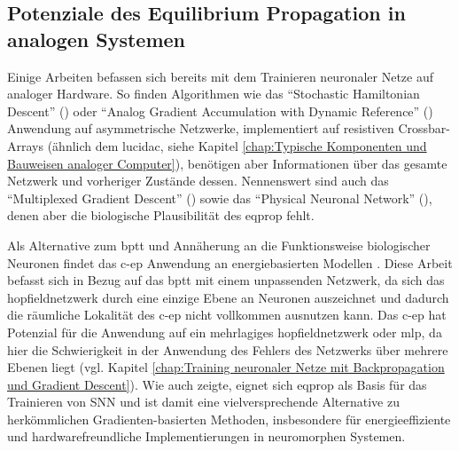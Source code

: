 \subsection{Potenziale des Equilibrium Propagation in analogen Systemen}
\label{chap:Potenziale des Equilibrium Propagation in analogen Systemen}

Einige Arbeiten befassen sich bereits mit dem Trainieren neuronaler Netze auf analoger Hardware. So finden Algorithmen wie das "`Stochastic Hamiltonian Descent"' (\cite{Onen2022}) oder "`Analog Gradient Accumulation with Dynamic Reference"' (\cite{Rasch2024}) Anwendung auf asymmetrische Netzwerke, implementiert auf resistiven Crossbar-Arrays (ähnlich \zb dem lucidac, siehe Kapitel \ref{chap:Typische Komponenten und Bauweisen analoger Computer}), benötigen aber Informationen über das gesamte Netzwerk und vorheriger Zustände dessen. Nennenswert sind auch das "`Multiplexed Gradient Descent"' (\cite{McCaughan2023}) sowie das "`Physical Neuronal Network"' (\cite{Sakemi2024}), denen aber die biologische Plausibilität des \gls{eqprop} fehlt.

Als Alternative zum \ac{bptt} und Annäherung an die Funktionsweise biologischer Neuronen findet das \gls{c-ep} Anwendung an energiebasierten Modellen \cite{Ernoult2020}. Diese Arbeit befasst sich in Bezug auf das \ac{bptt} mit einem unpassenden Netzwerk, da sich das \gls{hopfieldnetzwerk} durch eine einzige Ebene an Neuronen auszeichnet und dadurch die räumliche Lokalität des \gls{c-ep} nicht vollkommen ausnutzen kann. Das \gls{c-ep} hat Potenzial für die Anwendung auf ein mehrlagiges \gls{hopfieldnetzwerk} oder \gls{mlp}, da hier die Schwierigkeit in der Anwendung des Fehlers des Netzwerks über mehrere Ebenen liegt (vgl. Kapitel \ref{chap:Training neuronaler Netze mit Backpropagation und Gradient Descent}). Wie \cite{Martin2020} auch zeigte, eignet sich \gls{eqprop} als Basis für das Trainieren von \gls{SNN} und ist damit eine vielversprechende Alternative zu herkömmlichen Gradienten-basierten Methoden, insbesondere für energieeffiziente und hardwarefreundliche Implementierungen in neuromorphen Systemen.
